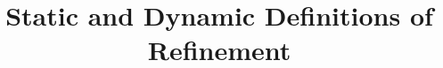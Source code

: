 \documentclass[10pt, conference, compsocconf]{IEEEtran}
\begin{document}
\theoremstyle{plain}
\newtheorem{thm}{Theorem}[section]
\newtheorem{proposition}[thm]{Proposition}
\newtheorem{corollary}[thm]{Corollary}
\newtheorem{lemma}[thm]{Lemma}
\newtheorem{definition}[thm]{Definition}
\newtheorem{convention}[thm]{Convention}

\theoremstyle{remark}
\newtheorem{remark}[thm]{Remark}
\newtheorem{example}[thm]{Example}

\setcounter{txtexamplecounter}{0}

\newenvironment{instexample}
{\vspace{0mm}\noindent\begin{small} }
{ \end{small}\vspace{0mm}}

\newcommand{\jrefine}{\asymp\negthickspace\triangleright} %
\newcommand{\nmdash}{\mid\negthinspace\backsim}
\newcommand{\nlref}{\textsc{nl}-refinement}
\newcommand{\srt}[1]{\textbf{\textit{#1}}}
\newcommand{\rsarrow}{\rightsquigarrow}

\title{Static and Dynamic Definitions of Refinement}
\author{
\and
{}
}



\maketitle
\end{document}
